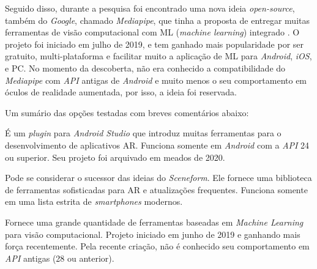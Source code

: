 Seguido disso, durante a pesquisa foi encontrado uma nova ideia \textit{open-source}, também do \textit{Google}, chamado \textit{Mediapipe}, que tinha a proposta de entregar muitas ferramentas de visão computacional com ML (\textit{machine learning}) integrado \cite{mediapipe-docs}. O projeto foi iniciado em julho de 2019, e tem ganhado mais popularidade por ser gratuito, multi-plataforma e facilitar muito a aplicação de ML para \textit{Android}, \textit{iOS}, e PC. No momento da descoberta, não era conhecido a compatibilidade do \textit{Mediapipe} com \textit{API} antigas de \textit{Android} e muito menos o seu comportamento em óculos de realidade aumentada, por isso, a ideia foi reservada.

\begin{description}
   \item Um sumário das opções testadas com breves comentários abaixo:
   \item[\textit{Google Sceneform}] É um \textit{plugin} para \textit{Android Studio} que introduz muitas ferramentas para o desenvolvimento de aplicativos AR. Funciona somente em \textit{Android} com a \textit{API} 24 ou superior. Seu projeto foi arquivado em meados de 2020. 
   \item[\textit{Google ARCore Services}] Pode se considerar o sucessor das ideias do \textit{Sceneform}. Ele fornece uma biblioteca de ferramentas sofisticadas para AR e atualizações frequentes. Funciona somente em uma lista estrita de \textit{smartphones} modernos. 
   \item[\textit{Mediapipe}] Fornece uma grande quantidade de ferramentas baseadas em \textit{Machine Learning} para visão computacional. Projeto iniciado em junho de 2019 e ganhando mais força recentemente. Pela recente criação, não é conhecido seu comportamento em \textit{API} antigas (28 ou anterior).
\end{description}

